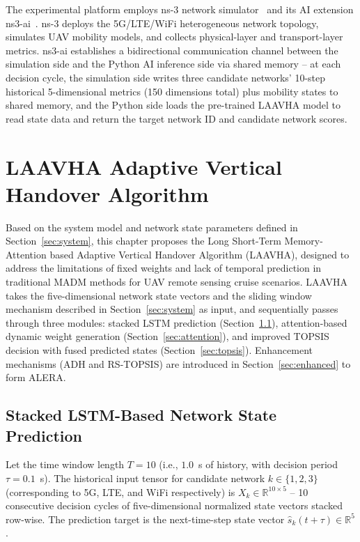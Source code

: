 \documentclass[journal,article,submit,moreauthors]{Definitions/mdpi}
\begin{document}
The experimental platform employs ns-3 network simulator~\cite{ref19} and its AI extension ns3-ai~\cite{ref20}. ns-3 deploys the 5G/LTE/WiFi heterogeneous network topology, simulates UAV mobility models, and collects physical-layer and transport-layer metrics. ns3-ai establishes a bidirectional communication channel between the simulation side and the Python AI inference side via shared memory -- at each decision cycle, the simulation side writes three candidate networks' 10-step historical 5-dimensional metrics (150 dimensions total) plus mobility states to shared memory, and the Python side loads the pre-trained LAAVHA model to read state data and return the target network ID and candidate network scores.

\section{LAAVHA Adaptive Vertical Handover Algorithm}
\label{sec:laavha}

Based on the system model and network state parameters defined in Section~\ref{sec:system}, this chapter proposes the Long Short-Term Memory-Attention based Adaptive Vertical Handover Algorithm (LAAVHA), designed to address the limitations of fixed weights and lack of temporal prediction in traditional MADM methods for UAV remote sensing cruise scenarios. LAAVHA takes the five-dimensional network state vectors and the sliding window mechanism described in Section~\ref{sec:system} as input, and sequentially passes through three modules: stacked LSTM prediction (Section~\ref{sec:lstm}), attention-based dynamic weight generation (Section~\ref{sec:attention}), and improved TOPSIS decision with fused predicted states (Section~\ref{sec:topsis}). Enhancement mechanisms (ADH and RS-TOPSIS) are introduced in Section~\ref{sec:enhanced} to form ALERA.

\subsection{Stacked LSTM-Based Network State Prediction}
\label{sec:lstm}

Let the time window length $T = 10$ (i.e., $1.0$~s of history, with decision period $\tau = 0.1$~s). The historical input tensor for candidate network $k \in \{1,2,3\}$ (corresponding to 5G, LTE, and WiFi respectively) is $X_k \in \mathbb{R}^{10 \times 5}$ -- 10 consecutive decision cycles of five-dimensional normalized state vectors stacked row-wise. The prediction target is the next-time-step state vector $\hat{s}_k(t+\tau) \in \mathbb{R}^5$.
\end{document}
